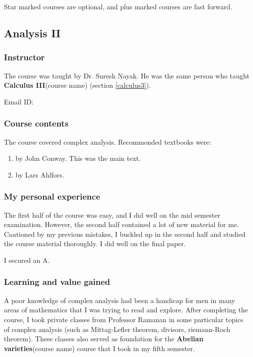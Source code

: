 \documentclass[a4paper]{amsart}
\newcommand{\coursename}[1]{{\bf #1}{\small{(course name)}}}
\begin{document}
Star marked courses are optional, and plus marked courses are fast forward.
\subsection{Analysis II}

\subsubsection{Instructor}

The course was taught by Dr. Suresh Nayak. He was the same person who
taught \coursename{Calculus III} (section \ref{calculus3}).

Email ID: 

\subsubsection{Course contents}

The course covered complex analysis. Recommonded textbooks were:

\begin{enumerate}

\item {} by John Conway. This was the main text.

\item {} by Lars Ahlfors.

\end{enumerate}


\subsubsection{My personal experience}

The first half of the course was easy, and I did well on the mid semester examination. 
However, the second half contained a lot of new material for me. 
Cautioned by my previous mistakes, I buckled up in the second half and studied the course material thoroughly.
I did well on the final paper.

I secured an A.

\subsubsection{Learning and value gained}

A poor knowledge of complex analysis had been a handicap for men in
many areas of mathematics that I was trying to read and explore. After
completing the course, I took private classes from Professor Ramanan
in some particular topics of complex analysis (such as Mittag-Lefler
theorem, divisors, riemann-Roch theorem). These classes also served as
foundation for the \coursename{Abelian varieties} course that I took
in my fifth semester.
\end{document}
